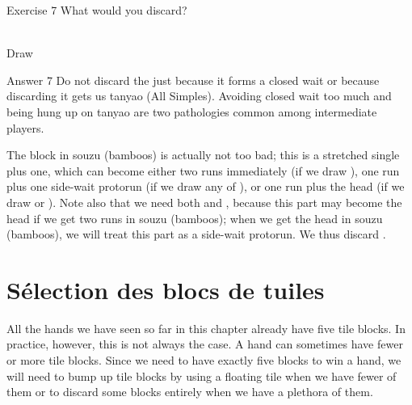 \vfill

\begin{itembox}[l]{Exercise 7}
What would you discard? 
\vspace{-10pt}

\bp
{}~\\
\hfill\footnotesize{Draw~~~~~~~~~~~}
\ep
\end{itembox}

\newpage


\begin{itembox}[r]{Answer 7}
\emj
Do not discard the {\LARGE{}} just because it forms a closed wait or because discarding it gets us {\jap tanyao} (All Simples). Avoiding closed wait too much and being hung up on {\jap tanyao} are two pathologies common among intermediate players. 
\bigskip

The block in {\jap souzu} (bamboos) is actually not too bad; this is a stretched single plus one, which can become either two runs immediately (if we draw {\LARGE{}}), one run plus one side-wait protorun (if we draw any of {\LARGE{}}), or one run plus the head (if we draw {\LARGE{}} or {\LARGE{}}). Note also that we need both {\LARGE{}} and {\LARGE{}}, because this part may become the head if we get two runs in {\jap souzu} (bamboos); when we get the head in {\jap souzu} (bamboos), we will treat this part as a side-wait protorun. We thus discard {\LARGE{}}. 
\end{itembox}


\newpage

\section{Sélection des blocs de tuiles}
All the hands we have seen so far in this chapter already have five tile blocks. In practice, however, this is not always the case. A hand can sometimes have fewer or more tile blocks. Since we need to have exactly five blocks to win a hand, we will need to bump up tile blocks by using a floating tile when we have fewer of them or to discard some blocks entirely when we have a plethora of them. 

